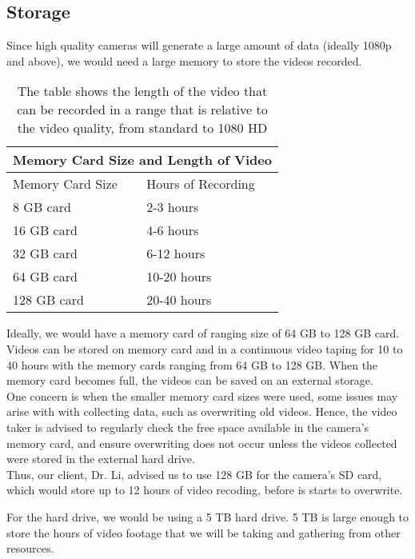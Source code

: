 \documentclass[10pt,draftclsnofoot,onecolumn,journal,compsoc]{IEEEtran}
\begin{document}
\subsection{Storage}
Since high quality cameras will generate a large amount of data (ideally 1080p and above), we would need a large memory to store the videos recorded.

\captionsetup{justification=centering}
\begin{table}[htp]
\begin{center}
\centering
\begin{tabular}{|p{3cm}||p{3cm}|}
 \hline
 \multicolumn{2}{|c|}{Memory Card Size and Length of Video}\\
 \hline
 Memory Card Size & Hours of Recording\\
 \hline
 8 GB card & 2-3 hours\\
 16 GB card & 4-6 hours\\
32 GB card & 6-12 hours \\
64 GB card & 10-20 hours\\
128 GB card & 20-40 hours\\
 \hline
\end{tabular}
\caption{The table shows the length of the video that can be recorded in a range that is relative to the video quality, from standard to 1080 HD}
\end{center}
\end{table}

Ideally, we would have a memory card of ranging size of 64 GB to 128 GB card. Videos can be stored on memory card and in a continuous video taping for 10 to 40 hours with the memory cards ranging from 64 GB to 128 GB. When the memory card becomes full, the videos can be saved on an external storage.\\

One concern is when the smaller memory card sizes were used, some issues may arise with with collecting data, such as overwriting old videos. Hence, the video taker is advised to regularly check the free space available in the camera’s memory card, and ensure overwriting does not occur unless the videos collected were stored in the external hard drive.\\

Thus, our client, Dr. Li, advised us to use 128 GB for the camera's SD card, which would store up to 12 hours of video recoding, before is starts to overwrite.

For the hard drive, we would be using a 5 TB hard drive. 5 TB is large enough to store the hours of video footage that we will be taking and gathering from other resources.\\
\end{document}
